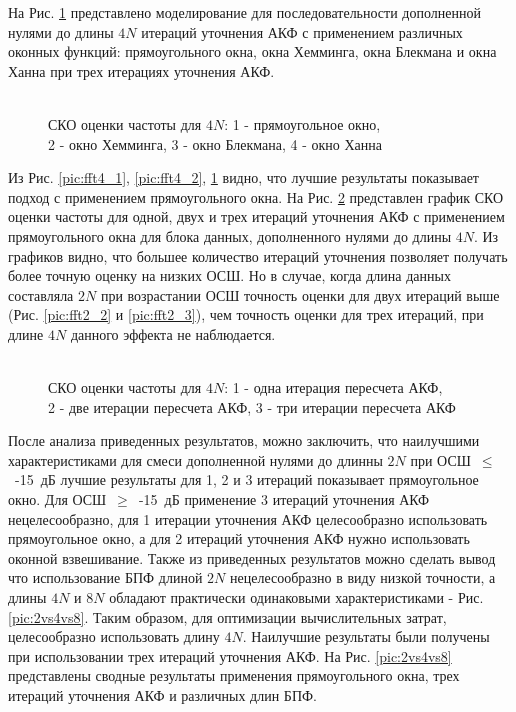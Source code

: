 На Рис. \ref{pic:fft4_3} представлено моделирование для последовательности дополненной нулями до длины ${4N}$ итераций уточнения АКФ с применением различных оконных функций:
прямоугольного окна, окна Хемминга, окна Блекмана и окна Ханна при трех итерациях уточнения АКФ.
\begin{figure}[h]
	\center{}
	\caption{\\СКО оценки частоты для ${4N}$: 1 - прямоугольное окно,\\2 - окно Хемминга, 3 - окно Блекмана, 4 - окно Ханна}
	\label{pic:fft4_3}
\end{figure}

Из Рис. \ref{pic:fft4_1}, \ref{pic:fft4_2}, \ref{pic:fft4_3} видно, что лучшие результаты показывает подход с применением прямоугольного окна.
На Рис. \ref{pic:fft4_rect_1_2_3}
представлен график СКО оценки частоты для одной, двух и трех итераций уточнения АКФ с применением прямоугольного окна для блока данных, дополненного нулями до длины ${4N}$.
Из графиков видно, что большее количество итераций уточнения позволяет получать более точную оценку на низких ОСШ. Но в случае, когда длина данных составляла ${2N}$
при возрастании ОСШ точность оценки для двух итераций выше (Рис. \ref{pic:fft2_2} и \ref{pic:fft2_3}), чем точность оценки для трех итераций, при длине ${4N}$ данного эффекта не наблюдается.
\begin{figure}[h]
	\center{}
	\caption{\\СКО оценки частоты для ${4N}$: 1 - одна итерация пересчета АКФ,\\2 - две итерации пересчета АКФ, 3 - три итерации пересчета АКФ}
	\label{pic:fft4_rect_1_2_3}
\end{figure}

После анализа приведенных результатов, можно заключить, что наилучшими характеристиками для смеси дополненной нулями до длинны ${2N}$ при \mbox{ОСШ ${\le}$ -15 дБ} лучшие результаты
для 1, 2 и 3 итераций показывает прямоугольное окно. Для \mbox{ОСШ ${\ge}$ -15 дБ} применение 3 итераций уточнения АКФ нецелесообразно, для 1 итерации уточнения АКФ целесообразно
использовать прямоугольное окно, а для 2 итераций уточнения АКФ нужно использовать оконной взвешивание.
Также из приведенных результатов можно сделать вывод что использование БПФ длиной ${2N}$ нецелесообразно в виду низкой
точности, а длины ${4N}$ и ${8N}$ обладают практически одинаковыми характеристиками - Рис. \ref{pic:2vs4vs8}. Таким образом, для оптимизации вычислительных затрат, целесообразно использовать длину ${4N}$. Наилучшие результаты были получены при
использовании трех итераций уточнения АКФ. На Рис. \ref{pic:2vs4vs8} представлены сводные результаты применения прямоугольного окна, трех итераций уточнения АКФ и различных длин БПФ.

